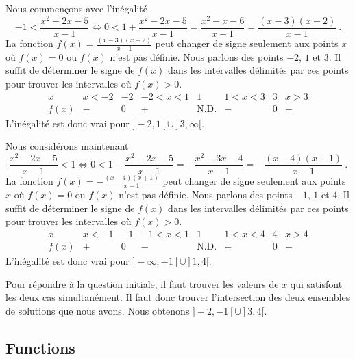 { Nous commençons avec l'inégalité
\[
  -1 < \frac{x^2-2x - 5}{x-1} \Leftrightarrow
  0 < 1 + \frac{x^2-2x - 5}{x-1} = \frac{x^2 -x - 6}{x-1}
  = \frac{(x-3)(x+2)}{x-1} \ .
\]
La fonction $\displaystyle f(x) = \frac{(x-3)(x+2)}{x-1}$ peut
changer de signe seulement aux points $x$ où $f(x) = 0$ ou $f(x)$ n'est
pas définie.  Nous parlons des points $-2$, $1$ et $3$.  Il
suffit de déterminer le signe de $f(x)$ dans les intervalles
délimités par ces points pour trouver les intervalles où $f(x) > 0$.
\[
\begin{array}{c|c|c|c|c|c|c|c}
x & x < -2 & -2 & -2 < x <1 & 1 & 1 < x < 3 & 3 & x > 3 \\
\hline
f(x) & - & 0 & + & \text{N.D.} & - & 0 & + 
\end{array}
\]
L'inégalité est donc vrai pour $]-2, 1[ \cup ]3,\infty[$.

 Nous considérons maintenant
\[
 \frac{x^2-2x - 5}{x-1} < 1 \Leftrightarrow
  0 < 1 - \frac{x^2-2x - 5}{x-1} = -\frac{x^2 - 3x - 4}{x-1}
  = -\frac{(x-4)(x+1)}{x-1} \ .
\]
La fonction $\displaystyle f(x) = -\frac{(x-4)(x+1)}{x-1}$ peut
changer de signe seulement aux points $x$ où $f(x) = 0$ ou $f(x)$ n'est
pas définie.  Nous parlons des points $-1$, $1$ et $4$.  Il
suffit de déterminer le signe de $f(x)$ dans les intervalles
délimités par ces points pour trouver les intervalles où $f(x) > 0$.
\[
\begin{array}{c|c|c|c|c|c|c|c}
x & x < -1 & -1 & -1 < x <1 & 1 & 1 < x < 4 & 4 & x > 4 \\
\hline
f(x) & + & 0 & - & \text{N.D.} & + & 0 & - 
\end{array}
\]
L'inégalité est donc vrai pour $]-\infty, -1[ \cup ]1,4[$.

Pour répondre à la question initiale, il faut trouver les valeurs de
$x$ qui satisfont les deux cas simultanément.  Il faut donc trouver
l'intersection des deux ensembles de solutions que nous avons.
Nous obtenons $]-2, -1[ \cup ]3,4[$.
}

\subsection{Functions}


